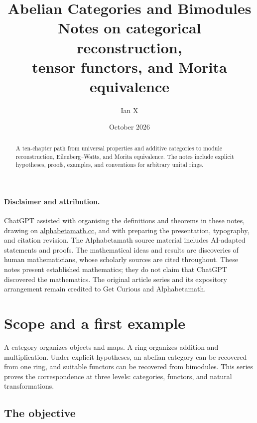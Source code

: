 \documentclass[11pt,a4paper]{article}
\title{Abelian Categories and Bimodules\\[0.4em]\large Notes on categorical reconstruction,\\tensor functors, and Morita equivalence}
\author{Ian X}
\date{October 2026}
\theoremstyle{plain}
\theoremstyle{definition}
\begin{document}
\maketitle
\begin{abstract}
A ten-chapter path from universal properties and additive categories to module reconstruction, Eilenberg--Watts, and Morita equivalence. The notes include explicit hypotheses, proofs, examples, and conventions for arbitrary unital rings.
\end{abstract}
\paragraph{Disclaimer and attribution.}
ChatGPT assisted with organising the definitions and theorems in these notes, drawing on \href{https://alphabetamath.cc/}{alphabetamath.cc}, and with preparing the presentation, typography, and citation revision. The Alphabetamath source material includes AI-adapted statements and proofs. The mathematical ideas and results are discoveries of human mathematicians, whose scholarly sources are cited throughout. These notes present established mathematics; they do not claim that ChatGPT discovered the mathematics. The original article series and its expository arrangement remain credited to Get Curious and Alphabetamath.
\tableofcontents
\clearpage

\section{Scope and a first example}
\label{chapter-01}
 
A category organizes objects and maps. A ring organizes addition and multiplication. Under explicit hypotheses, an abelian category can be recovered from one ring, and suitable functors can be recovered from bimodules. This series proves the correspondence at three levels: categories, functors, and natural transformations.

 
\subsection{The objective}
\end{document}

